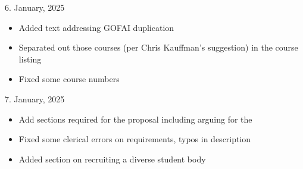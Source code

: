 6. January, 2025

\begin{itemize}
    \item Added text addressing GOFAI duplication
    \item Separated out those courses (per Chris Kauffman's suggestion) in the course listing
    \item Fixed some course numbers
\end{itemize}

7. January, 2025

\begin{itemize}
    \item Add sections required for the  proposal including arguing for the 
    \item Fixed some clerical errors on requirements, typos in description
    \item Added section on recruiting a diverse student body
\end{itemize}